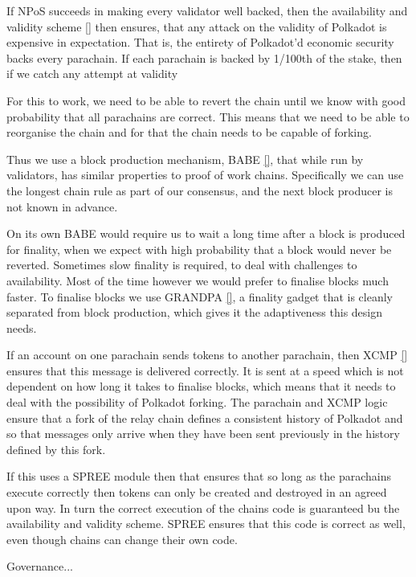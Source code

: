 If NPoS succeeds in making every validator well backed, then the availability and validity scheme \ref{} then ensures, that any attack on the validity of Polkadot is expensive in expectation. That is, the entirety of Polkadot'd economic security backs every parachain. If each parachain is backed by 1/100th of the stake, then if we catch any attempt at validity 

For this to work, we need to be able to revert the chain until we know with good probability that all parachains are correct. This means that we need to be able to reorganise the chain and for that the chain needs to be capable of forking.

Thus we use a block production mechanism, BABE \ref{}, that while run by validators, has similar properties to proof of work chains. Specifically we can use the longest chain rule as part of our consensus, and the next block producer is not known in advance.

On its own BABE would require us to wait a long time after a block is produced for finality, when we expect with high probability that a block would never be reverted. Sometimes slow finality is required, to deal with challenges to availability. Most of the time however we would prefer to finalise blocks much faster.  To finalise blocks we use GRANDPA \ref{}, a finality gadget that is cleanly separated from block production, which gives it the adaptiveness this design needs. 


If an account on one parachain sends tokens to another parachain, then XCMP \ref{} ensures that this message is delivered correctly. It is sent at a speed which is not dependent on how long it takes to finalise blocks, which means that it needs to deal with the possibility of Polkadot forking. The parachain and XCMP logic ensure that a fork of the relay chain defines a consistent history of Polkadot and so that messages only arrive when they have been sent previously in the history defined by this fork.

If this uses a SPREE module then that ensures that so long as the parachains execute correctly then tokens can only be created and destroyed in an agreed upon way. In turn the correct execution of the chains code is guaranteed bu the availability and validity scheme. SPREE ensures that this code is correct as well, even though chains can change their own code.

Governance...

